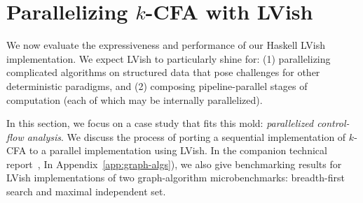 \section{Parallelizing $k$-CFA with LVish}\label{s:lvish-k-cfa}


We now evaluate 
the expressiveness and performance of our Haskell LVish implementation.
We expect LVish to particularly shine for:
  (1) parallelizing complicated algorithms on structured data that pose 
    challenges for other deterministic paradigms, and 
  (2) composing pipeline-parallel stages of computation 
     (each of which may be internally parallelized).



In this section, we focus on a case study that fits this mold:
\emph{parallelized control-flow analysis}.  We discuss the process of
porting a sequential implementation of $k$-CFA to a parallel
implementation using LVish.
\ifx\fulltr\undefined
In the companion technical
report~\cite{Freeze-TR}, 
\else
In Appendix~\ref{app:graph-algs}),
\fi
we also give benchmarking results for LVish
implementations of two graph-algorithm microbenchmarks: breadth-first
search and maximal independent set.







